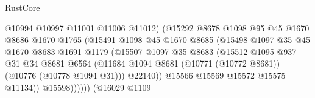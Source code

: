 \begin{lexlean}{RustCore}
\begin{coremodule}
                                        @10994
                                        @10997
                                        @11001
                                        @11006
                                        @11012)
                                      (@15292
                                        @8678
                                        @1098
                                        @95
                                        @45
                                        @1670
                                        @8686
                                        @1670
                                        @1765
                                        (@15491
                                          @1098
                                          @45
                                          @1670
                                          @8685
                                          (@15498
                                            @1097
                                            @35
                                            @45
                                            @1670
                                            @8683
                                            @1691
                                            @1179
                                            (@15507
                                              @1097
                                              @35
                                              @8683
                                              (@15512
                                                @1095
                                                @937
                                                @31
                                                @34
                                                @8681
                                                @6564
                                                (@11684
                                                  @1094
                                                  @8681
                                                  (@10771 (@10772 @8681))
                                                  (@10776 (@10778 @1094 @31)))
                                                @22140))
                                            @15566
                                            @15569
                                            @15572
                                            @15575
                                            @11134))
                                        @15598))))))
                            (@16029
                              @1109

\end{coremodule}
\end{lexlean}
